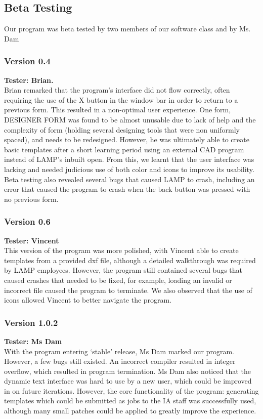 \documentclass[oneside,openany,11pt,a4paper]{report}
\begin{document}
\subsection{Beta Testing}
Our program was beta tested by two members of our software class and by Ms. Dam
\subsubsection{Version 0.4}
\textbf{Tester: Brian.} \\
Brian remarked that the program’s interface did not flow correctly, often requiring the use of the X button in the window bar in order to return to a previous form. This resulted in a non-optimal user experience. One form, DESIGNER FORM was found to be almost unusable due to lack of help and the complexity of form (holding several designing tools that were non uniformly spaced), and needs to be redesigned. However, he was ultimately able to create basic templates after a short learning period using an external CAD program instead of LAMP’s inbuilt open. From this, we learnt that the user interface was lacking and needed judicious use of both color and icons to improve its usability. Beta testing also revealed several bugs that caused LAMP to crash, including an error that caused the program to crash when the back button was pressed with no previous form.


\subsubsection{Version 0.6}
\textbf{Tester: Vincent} \\
This version of the program was more polished, with Vincent able to create templates from a provided dxf file, although a detailed walkthrough was required by LAMP employees. However, the program still contained several bugs that caused crashes that needed to be fixed, for example, loading an invalid or incorrect file caused the program to terminate. We also observed that the use of icons allowed Vincent to better navigate the program.

\subsubsection{Version 1.0.2}
\textbf{Tester: Ms Dam} \\
With the program entering ‘stable’ release, Ms Dam marked our program. However, a few bugs still existed.
An incorrect compiler resulted in integer overflow, which resulted in program termination. Ms Dam also noticed that the dynamic text interface
was hard to use by a new user, which could be improved in on future iterations. However, the core functionality of the program: generating
templates which could be submitted as jobs to the IA staff was successfully used, although many small patches could be applied to greatly
improve the experience.
\end{document}
